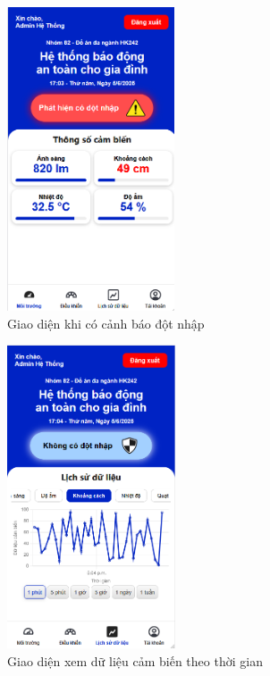 \begin{minipage}{0.45\textwidth}
    \begin{figure}[H]
        \centering
        \includegraphics[height=9cm]{figures/dotnhap.png}
        \caption{Giao diện khi có cảnh báo đột nhập}
        \label{fig:dotnhap}
    \end{figure}
\end{minipage}
\hfill
\begin{minipage}{0.45\textwidth}
    \begin{center}
        \begin{figure}[H]
            \centering
            \includegraphics[height=9cm]{figures/dulieu.png}
            \caption{Giao diện xem dữ liệu cảm biến theo thời gian}
            \label{fig:dulieu}
        \end{figure}
    \end{center}
\end{minipage}

